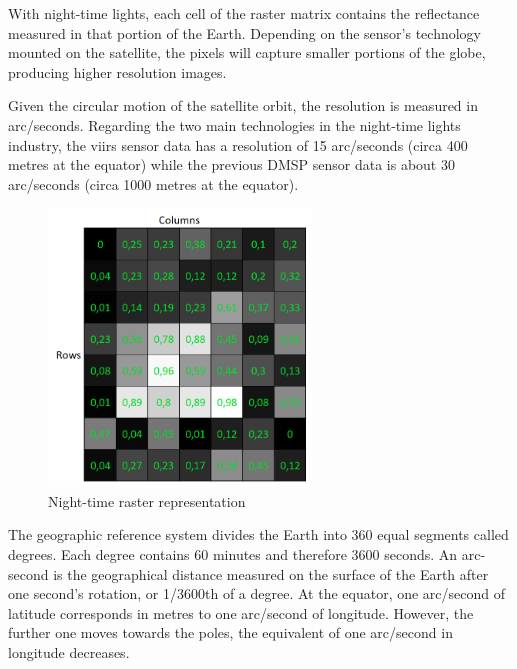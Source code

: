 With night-time lights, each cell of the raster matrix contains the reflectance measured in that portion of the Earth.
Depending on the sensor's technology mounted on the satellite, the pixels will capture smaller portions of the globe, producing higher resolution images. 

Given the circular motion of the satellite orbit, the resolution is measured in arc/seconds. Regarding the two main technologies in the night-time lights industry, the viirs sensor data has a resolution of 15 arc/seconds (circa 400 metres at the equator) while the previous DMSP sensor data is about 30 arc/seconds (circa 1000 metres at the equator). 
\begin{figure}[h]
    \begin{center}
    \includegraphics[width=7cm]{images/raster_night.png}
    \end{center}
    \caption{Night-time raster representation}
\end{figure}
The geographic reference system divides the Earth into 360 equal segments called degrees. Each degree contains 60 minutes and therefore 3600 seconds.
An arc-second is the geographical distance measured on the surface of the Earth after one second's rotation, or 1/3600th of a degree.
At the equator, one arc/second of latitude corresponds in metres to one arc/second of longitude. However, the further one moves towards the poles, the equivalent of one arc/second in longitude decreases.
  
